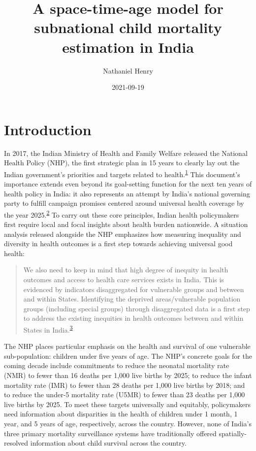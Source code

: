 \documentclass[
]{article}
\title{A space-time-age model for subnational child mortality estimation in India}
\author{Nathaniel Henry\textsuperscript{}}
\date{2021-09-19}
\begin{document}
\maketitle

\hypertarget{introduction}{%
\section{Introduction}\label{introduction}}

In 2017, the Indian Ministry of Health and Family Welfare released the National Health Policy (NHP), the first strategic plan in 15 years to clearly lay out the Indian government's priorities and targets related to health.\textsuperscript{\protect\hyperlink{ref-IND_MOHFW2017}{1}} This document's importance extends even beyond its goal-setting function for the next ten years of health policy in India: it also represents an attempt by India's national governing party to fulfill campaign promises centered around universal health coverage by the year 2025.\textsuperscript{\protect\hyperlink{ref-Sundararaman2017}{2}} To carry out these core principles, Indian health policymakers first require local and focal insights about health burden nationwide. A situation analysis released alongside the NHP emphasizes how measuring inequality and diversity in health outcomes is a first step towards achieving universal good health:

\begin{quote}
We also need to keep in mind that high degree of inequity in health outcomes and access to health care services exists in India. This is evidenced by indicators disaggregated for vulnerable groups and between and within States. Identifying the deprived areas/vulnerable population groups (including special groups) through disaggregated data is a first step to address the existing inequities in health outcomes between and within States in India.\textsuperscript{\protect\hyperlink{ref-IND_MOHFW2017a}{3}}
\end{quote}

The NHP places particular emphasis on the health and survival of one vulnerable sub-population: children under five years of age. The NHP's concrete goals for the coming decade include commitments to reduce the neonatal mortality rate (NMR) to fewer than 16 deaths per 1,000 live births by 2025; to reduce the infant mortality rate (IMR) to fewer than 28 deaths per 1,000 live births by 2018; and to reduce the under-5 mortality rate (U5MR) to fewer than 23 deaths per 1,000 live births by 2025. To meet these targets universally and equitably, policymakers need information about disparities in the health of children under 1 month, 1 year, and 5 years of age, respectively, across the country. However, none of India's three primary mortality surveillance systems have traditionally offered spatially-resolved information about child survival across the country.
\end{document}
